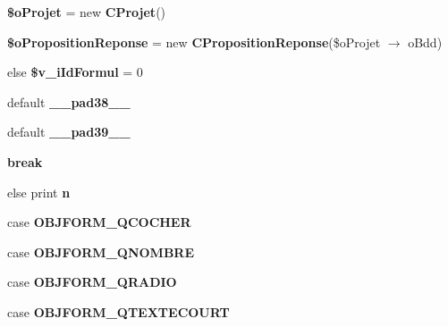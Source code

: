 \begin{CompactItemize}
\item 
\textbf{\$oProjet} = new {\bf CProjet}()\label{tableau__scores_8php_ec412e7ac901485e72b77d2185159421}

\item 
\textbf{\$oPropositionReponse} = new {\bf CPropositionReponse}(\$oProjet $\rightarrow$ oBdd)\label{tableau__scores_8php_9d8d6c3032a74c6899fb9707f3fc23e0}

\item 
else \textbf{\$v\_\-iIdFormul} = 0\label{tableau__scores_8php_4e4b0658a95dd7eca2670bc084fd65b8}

\item 
default \textbf{\_\-\_\-pad38\_\-\_\-}\label{tableau__scores_8php_986842749407fc12715451ab1b5e2535}

\item 
default \textbf{\_\-\_\-pad39\_\-\_\-}\label{tableau__scores_8php_f1cd14a2ab9d1487567c264239c2fb18}

\item 
\textbf{break}\label{tableau__scores_8php_91cf6fbebedd86150a36e5ac3d5d3bfc}

\item 
else print \textbf{n}\label{tableau__scores_8php_2278a16be518a3ddf4d0a315be97fc77}

\item 
case \textbf{OBJFORM\_\-QCOCHER}\label{tableau__scores_8php_32be139a5154afa75b95b81a17242d51}

\item 
case \textbf{OBJFORM\_\-QNOMBRE}\label{tableau__scores_8php_256e65a67ed5add9d8619d7cacd225b6}

\item 
case \textbf{OBJFORM\_\-QRADIO}\label{tableau__scores_8php_7e7f00700a09fd01f0f653498c88a574}

\item 
case \textbf{OBJFORM\_\-QTEXTECOURT}\label{tableau__scores_8php_7086e52296f594ecab7aef00fe84038f}

\end{CompactItemize}
